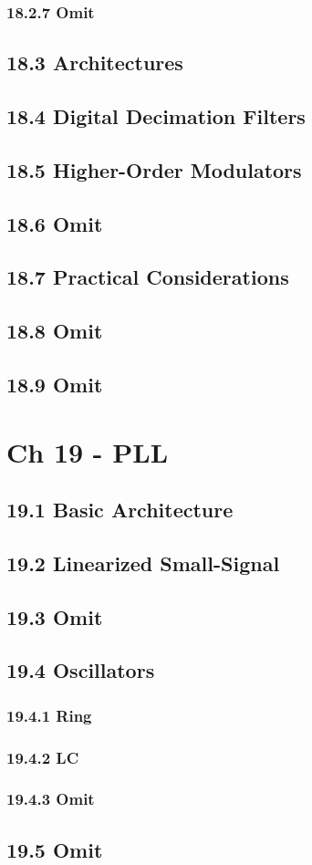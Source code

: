 \documentclass[a4paper,twocolumn]{article}
\begin{document}
      \subsubsection{18.2.7 Omit}
    \subsection{18.3 Architectures}
    \subsection{18.4 Digital Decimation Filters}
    \subsection{18.5 Higher-Order Modulators}
    \subsection{18.6 Omit}
    \subsection{18.7 Practical Considerations}
    \subsection{18.8 Omit}
    \subsection{18.9 Omit}
  \section{Ch 19 - PLL}
    \subsection{19.1 Basic Architecture}
    \subsection{19.2 Linearized Small-Signal}
    \subsection{19.3 Omit}
    \subsection{19.4 Oscillators}
      \subsubsection{19.4.1 Ring}
      \subsubsection{19.4.2 LC}
      \subsubsection{19.4.3 Omit}
    \subsection{19.5 Omit}
\end{document}
